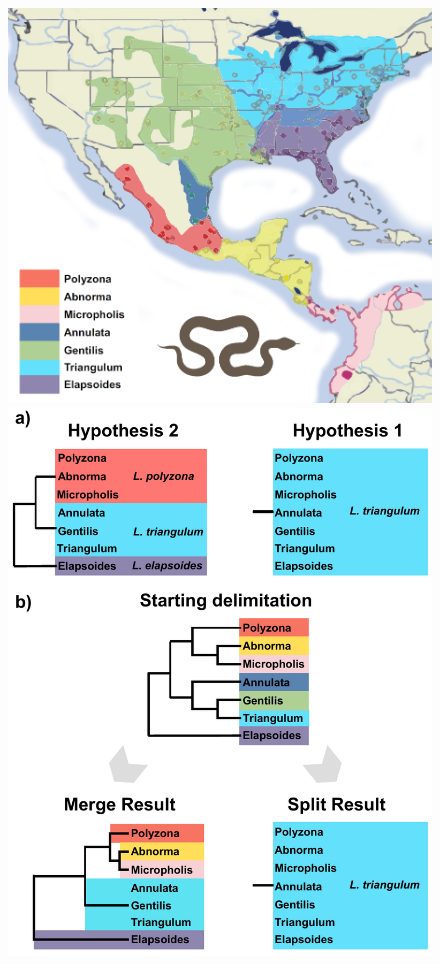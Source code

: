 \documentclass{article1}
\begin{document}
\begin{figure}[t]
    \centering %
    \includegraphics[scale=0.6]{figs/Lampro/figure} %
    \includegraphics[scale=0.5]{figs/fig-miksnakes-results} %
    

\end{figure}
\end{document}
